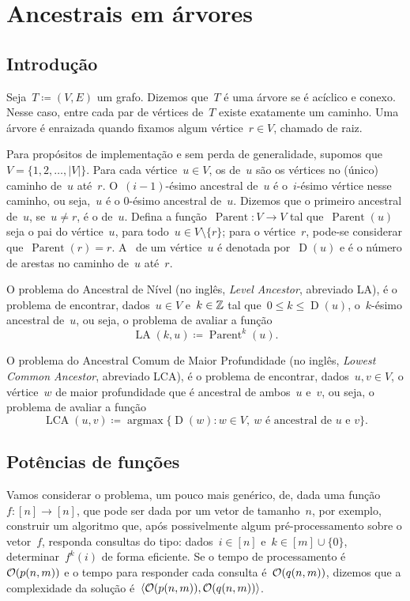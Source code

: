 \documentclass[main.tex]{subfiles}
\providecommand{\Par}{\operatorname{Parent}}
\newcommand{\LA}{\operatorname{LA}}
\newcommand{\Dep}{\operatorname{D}}
\newcommand{\LCA}{\operatorname{LCA}}
\newcommand{\argmax}{\operatorname{argmax}}
\begin{document}
\chapter{Ancestrais em árvores} \label{cap:ancestrais}

\section{Introdução}

Seja~$T \coloneqq (V, E)$ um grafo. Dizemos que~$T$ é uma árvore se é acíclico e conexo. Nesse caso, entre cada par de vértices de~$T$ existe exatamente um caminho. Uma árvore é enraizada quando fixamos algum vértice~${r \in V}$, chamado de raiz.

Para propósitos de implementação e sem perda de generalidade, supomos que~$V = \{1, 2, \ldots, |V|\}$.
Para cada vértice~${u \in V}$, os  de~$u$ são os vértices no (único) caminho de~$u$ até~$r$. O~$(i-1)$-ésimo ancestral de~$u$ é o~$i$-ésimo vértice nesse caminho, ou seja,~$u$ é o $0$-ésimo ancestral de~$u$. Dizemos que o primeiro ancestral de~$u$, se~$u \neq r$, é o  de~$u$. Defina a função~${\Par: V \rightarrow V}$ tal que~$\Par(u)$ seja o pai do vértice~$u$, para todo~$u \in V \setminus \{r\}$; para o vértice~$r$, pode-se considerar que~$\Par(r) = r$. A~ de um vértice~$u$ é denotada por~$\Dep(u)$ e é o número de arestas no caminho de~$u$ até~$r$.

O problema do Ancestral de Nível (no inglês, \textit{Level Ancestor}, abreviado LA), é o problema de encontrar, dados~$u \in V$ e~$k \in \mathbb{Z}$ tal que~$0 \leq k \leq \Dep(u)$, o~$k$-ésimo ancestral de~$u$, ou seja, o problema de avaliar a função
$$\LA(k, u) \coloneqq \Par^k(u). $$

O problema do Ancestral Comum de Maior Profundidade (no inglês, \textit{Lowest Common Ancestor}, abreviado LCA), é o problema de encontrar, dados~$u, v \in V$, o vértice~$w$ de maior profundidade que é ancestral de ambos~$u$ e~$v$, ou seja, o problema de avaliar a função
$$\LCA(u, v) \coloneqq \argmax\{\Dep(w) : w \in V,\ w \text{ é ancestral de $u$ e $v$}\}. $$

\section{Potências de funções} \label{sec:potfunc}

Vamos considerar o problema, um pouco mais genérico, de, dada uma função~$f : [n] \rightarrow [n]$, que pode ser dada por um vetor de tamanho~$n$, por exemplo, construir um algoritmo que, após possivelmente algum pré-processamento sobre o vetor~$f$, responda consultas do tipo: dados~$i \in [n]$ e~$k \in [m] \cup \{0\}$, determinar~$f^k(i)$ de forma eficiente. Se o tempo de processamento é~$\mathcal{O}(p(n, m))$ e o tempo para responder cada consulta é~$\mathcal{O}(q(n, m))$, dizemos que a complexidade da solução é~$\langle\mathcal{O}(p(n, m)), \mathcal{O}(q(n, m))\rangle$.
\end{document}
